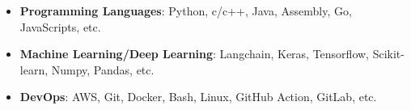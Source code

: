 \documentclass[a4paper,11pt]{article}
\begin{document}
    \begin{itemize}[leftmargin=0.15in, label={-}, itemsep=-2pt, topsep=0pt]
        \item \textbf{Programming Languages}: Python, c/c++, Java, Assembly, Go, JavaScripts, etc.
        \item \textbf{Machine Learning/Deep Learning}: Langchain, Keras, Tensorflow, Scikit-learn, Numpy, Pandas, etc.
        \item \textbf{DevOps}: AWS, Git, Docker, Bash, Linux, GitHub Action, GitLab, etc.
    \end{itemize}

\end{document}
